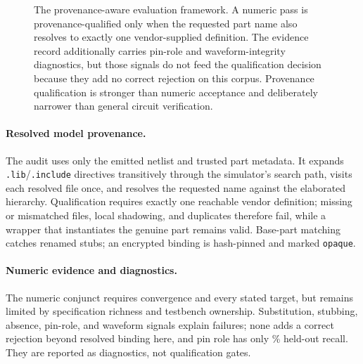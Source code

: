 \begin{figure}[t]
\caption{The provenance-aware evaluation framework. A numeric pass is
  provenance-qualified only when the requested part name also resolves to
  exactly one vendor-supplied definition. The evidence record additionally
  carries pin-role and waveform-integrity diagnostics, but those signals do
  not feed the qualification decision because they add no correct rejection
  on this corpus. Provenance qualification is stronger than numeric acceptance
  and deliberately narrower than general circuit verification.}
\label{fig:protocol}
\end{figure}

\paragraph{Resolved model provenance.}
The audit uses only the emitted netlist and trusted part metadata. It expands
\texttt{.lib}/\texttt{.include} directives transitively through the
simulator's search path, visits each resolved file once, and resolves the
requested name against the elaborated hierarchy. Qualification requires
exactly one reachable vendor definition; missing or mismatched files, local
shadowing, and duplicates therefore fail, while a wrapper that instantiates
the genuine part remains valid. Base-part matching catches renamed stubs; an
encrypted binding is hash-pinned and marked \texttt{opaque}.

\paragraph{Numeric evidence and diagnostics.}
The numeric conjunct requires convergence and every stated target, but remains
limited by specification richness and testbench ownership. Substitution,
stubbing, absence, pin-role, and waveform signals explain failures; none adds
a correct rejection beyond resolved binding here, and pin role has only
\MutPinPermuteRate{}\% held-out recall. They are reported as diagnostics, not
qualification gates.

